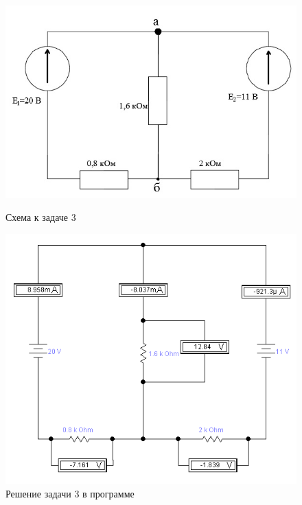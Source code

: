 \begin{figure}[H]
\begin{changemargin}{-1.5cm}{-2cm}
  \begin{center}
    \begin{minipage}[h]{0.5\linewidth}
        \includegraphics[width=1\textwidth]{authors/stepanuk-2-fig-5.png}
        \caption{Схема к задаче 3}
        \label{fig:stepanuk-2-fig-5}
    \end{minipage}
\hfill
    \begin{minipage}[h]{0.4\linewidth}
        \includegraphics[width=1\textwidth]{authors/stepanuk-2-fig-6.png}
        \caption{Решение задачи 3 в программе}
        \label{fig:stepanuk-2-fig-6}
    \end{minipage}


  \end{center}
\end{changemargin}

\end{figure}
